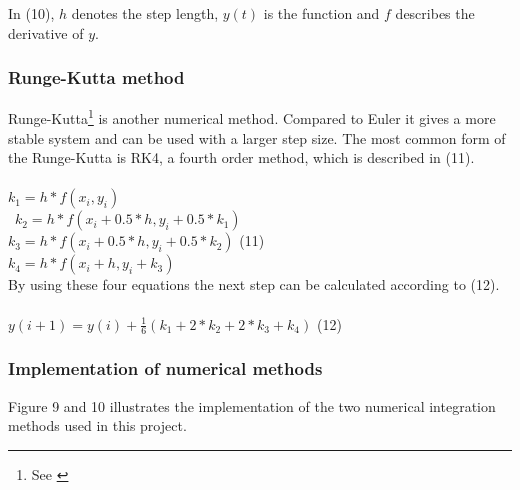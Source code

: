 \documentclass[a4paper,12pt,twoside,english]{article}
\begin{document}
In (10), $h$ denotes the step length, $y(t)$ is the function and $f$ describes the derivative of $y$.
\subsubsection{Runge-Kutta method}
Runge-Kutta\footnote{See \cite[p.~460, 491]{Mat:04}} is another numerical method. Compared to Euler it gives a more stable system and can be used with a larger step size. The most common form of the Runge-Kutta is RK4, a fourth order method, which is described in (11).\\ \\
$k_1 = h*f(x_i, y_i) $ \\ \
$k_2 = h*f(x_i + 0.5*h, y_i + 0.5*k_1) $ \\
$k_3 = h*f(x_i + 0.5*h, y_i + 0.5*k_2)$ \hfill (11) \\
$k_4 = h*f(x_i + h, y_i + k_3)$ \\

By using these four equations the next step can be calculated according to (12). \\ \\
$ y(i+1) = y(i) + \frac{1}{6}( k_1 + 2*k_2 + 2*k_3 + k_4) $ \hfill (12)

\subsubsection{Implementation of numerical methods}

Figure 9 and 10 illustrates the implementation of the two numerical integration methods used in this project.
\end{document}
